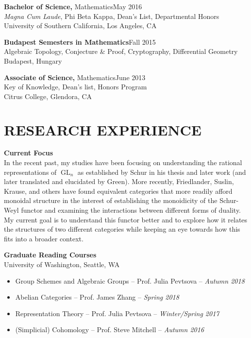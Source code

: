 \documentclass[margin]{res} %
\begin{document}
\begin{resume}
{\bf Bachelor of Science,} Mathematics\hfill May 2016 \\
{\sl Magna Cum Laude}, Phi Beta Kappa, Dean's List, Departmental Honors \\
University of Southern California, Los Angeles, CA 

{\bf Budapest Semesters in Mathematics}\hfill Fall 2015 \\
Algebraic Topology, Conjecture \& Proof, Cryptography, Differential Geometry  \\
Budapest, Hungary 

{\bf Associate of Science,} Mathematics\hfill June 2013\\
Key of Knowledge, Dean's list, Honors Program \\
Citrus College, Glendora, CA 
 

\section{RESEARCH EXPERIENCE}

{\bf Current Focus}\\
In the recent past, my studies have been focusing on understanding the rational representations of $\operatorname{GL}_n$ as established by Schur in his thesis 
and later work (and later translated and elucidated by Green). More recently, Friedlander, Suslin, Krause,
and others have found equivalent categories that more readily afford monoidal structure in the interest of establishing the monoidicity 
of the Schur-Weyl functor and examining the interactions between different forms of duality. My current goal is to understand this functor better and to 
explore how it relates the structures of two different categories while keeping an eye towards how this fits into a broader context.

{\bf Graduate Reading Courses} \\
University of Washington, Seattle, WA
\begin{itemize} \itemsep -1pt %
	\item Group Schemes and Algebraic Groups -- Prof. Julia Pevtsova -- {\sl Autumn 2018}
	\item Abelian Categories -- Prof. James Zhang -- {\sl Spring 2018}
	\item Representation Theory -- Prof. Julia Pevtsova -- {\sl Winter/Spring 2017}
	\item (Simplicial) Cohomology -- Prof. Steve Mitchell -- {\sl Autumn 2016}
\end{itemize}


\end{resume}
\end{document}
